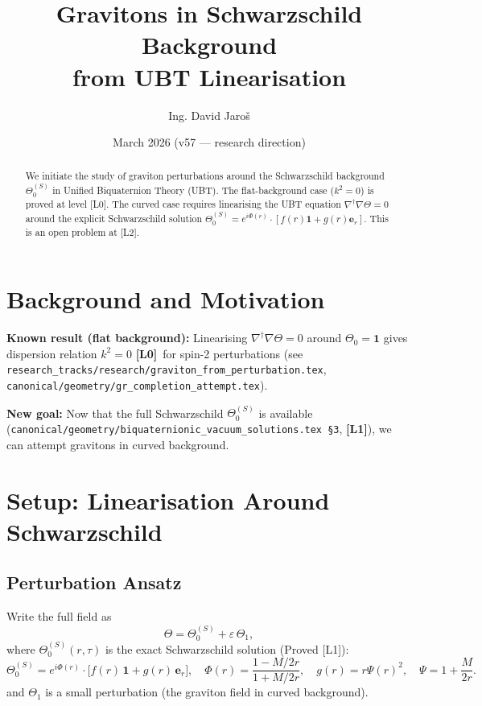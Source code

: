 \documentclass[12pt]{article}
\title{\textbf{Gravitons in Schwarzschild Background\\
       from UBT Linearisation}}
\author{Ing. David Jaroš}
\date{March 2026 (v57 — research direction)}
\theoremstyle{definition}
\theoremstyle{remark}
\newcommand{\Lzero}{\textbf{[L0]}}
\newcommand{\Lone}{\textbf{[L1]}}
\begin{document}
\maketitle

\begin{abstract}
We initiate the study of graviton perturbations around the Schwarzschild
background $\Theta_0^{(S)}$ in Unified Biquaternion Theory (UBT).
The flat-background case ($k^2 = 0$) is proved at level [L0].
The curved case requires linearising the UBT equation
$\nabla^\dagger\nabla\Theta = 0$ around the explicit Schwarzschild
solution $\Theta_0^{(S)} = e^{i\Phi(r)}\cdot[f(r)\mathbf{1}+g(r)\boldsymbol{e}_r]$.
This is an open problem at [L2].
\end{abstract}

\section{Background and Motivation}

\textbf{Known result (flat background):}
Linearising $\nabla^\dagger\nabla\Theta = 0$ around $\Theta_0 = \mathbf{1}$
gives dispersion relation $k^2 = 0$ \Lzero\ for spin-2 perturbations
(see \texttt{research\_tracks/research/graviton\_from\_perturbation.tex},
\texttt{canonical/geometry/gr\_completion\_attempt.tex}).

\textbf{New goal:}
Now that the full Schwarzschild $\Theta_0^{(S)}$ is available
(\texttt{canonical/geometry/biquaternionic\_vacuum\_solutions.tex §3},
\Lone), we can attempt gravitons in curved background.

\section{Setup: Linearisation Around Schwarzschild}
\label{sec:setup}

\subsection{Perturbation Ansatz}

Write the full field as
\begin{equation}
  \Theta = \Theta_0^{(S)} + \varepsilon\,\Theta_1,
  \label{eq:pert_ansatz}
\end{equation}
where $\Theta_0^{(S)}(r,\tau)$ is the exact Schwarzschild solution (Proved [L1]):
\begin{equation}
  \Theta_0^{(S)} = e^{i\Phi(r)}\cdot\bigl[f(r)\,\mathbf{1}
    + g(r)\,\boldsymbol{e}_r\bigr],
  \quad \Phi(r) = \frac{1-M/2r}{1+M/2r},\quad
  g(r) = r\Psi(r)^2,\quad \Psi = 1+\frac{M}{2r}.
  \label{eq:theta0_schw}
\end{equation}
and $\Theta_1$ is a small perturbation (the graviton field in curved background).
\end{document}
